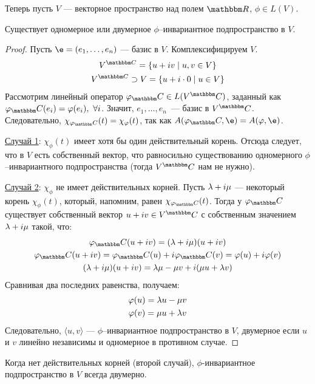 \vspace{0.2cm}
Теперь пусть $V$ --- векторное пространство над полем $\R$, $\phi \in L(V)$.

\begin{Theorem}
Существует одномерное или двумерное $\phi$--инвариантное подпространство в $V$.
\end{Theorem}

\begin{proof}
Пусть $\e = (e_1, \ldots, e_n)$ --- базис в $V$. Комплексифицируем $V$.
\begin{gather*}
V^{\C} = \{ u + iv \mid u, v \in V \} \\
V^{\C} \supset V = \{u + i\cdot0 \mid u \in V  \}
\end{gather*}
Рассмотрим линейный оператор $\phi_\C \in L(V^\C)$, заданный как $\phi_\C(e_i) = \phi(e_i),\ \forall i$. Значит, $e_1, \ldots, e_n$~--- базис в $V^\C$. Следовательно, $\chi_{\phi_\C}(t) = \chi_\phi(t)$, так как $A(\phi_\C, \e) = A(\phi, \e)$.

\underline{Случай 1}: $\chi_\phi(t)$ имеет хотя бы один действительный корень. Отсюда следует, что в $V$ есть собственный вектор, что равносильно существованию одномерного $\phi$--инвариантного подпространства (тогда $V^\C$ нам не нужно).

\underline{Случай 2}: $\chi_\phi$ не имеет действительных корней. Пусть $\lambda + i\mu$ --- некоторый корень $\chi_\phi(t) $, который, напомним, равен $\chi_{\phi_\C}(t)$. Тогда у $\phi_\C$ существует собственный вектор $u+iv \in V^\C$  с собственным значением $\lambda + i\mu$ такой, что:
\begin{gather*}
\phi_\C(u+iv) = (\l + i\mu)(u+iv)\\
\phi_\C(u + iv) = \phi_\C(u) + i\phi_\C(v) = \phi(u) + i\phi(v) \\
(\l + i\mu)(u + iv) = \l \mu - \mu v + i(\mu u + \l v)
\end{gather*}
Сравнивая два последних равенства, получаем:
\begin{gather*}
\varphi(u) =  \lambda u - \mu v \\
\varphi(v) = \mu u + \lambda v
\end{gather*}
Следовательно, $\langle u, v \rangle$ --- $\phi$--инвариантное подпространство в $V$, двумерное если $u$ и $v$ линейно независимы и одномерное в противном случае.
\end{proof}

\begin{Task}
Когда нет действительных корней (второй случай), $\phi$-инвариантное подпространство в $V$ всегда двумерно.
\end{Task}

